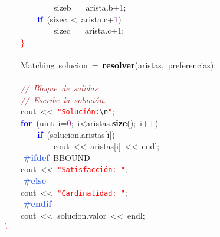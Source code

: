 \mbox{}\ \ \ \ \ \ \ \ \ \ \ \ sizeb\ \textcolor{BrickRed}{=}\ arista\textcolor{BrickRed}{.}b\textcolor{BrickRed}{+}\textcolor{Purple}{1}\textcolor{BrickRed}{;} \\
\mbox{}\ \ \ \ \ \ \ \ \textbf{\textcolor{Blue}{if}}\ \textcolor{BrickRed}{(}sizec\ \textcolor{BrickRed}{\textless{}}\ arista\textcolor{BrickRed}{.}c\textcolor{BrickRed}{+}\textcolor{Purple}{1}\textcolor{BrickRed}{)} \\
\mbox{}\ \ \ \ \ \ \ \ \ \ \ \ sizec\ \textcolor{BrickRed}{=}\ arista\textcolor{BrickRed}{.}c\textcolor{BrickRed}{+}\textcolor{Purple}{1}\textcolor{BrickRed}{;} \\
\mbox{}\ \ \ \ \textcolor{Red}{\}} \\
\mbox{} \\
\mbox{}\ \ \ \ \textcolor{TealBlue}{Matching}\ solucion\ \textcolor{BrickRed}{=}\ \textbf{\textcolor{Black}{resolver}}\textcolor{BrickRed}{(}aristas\textcolor{BrickRed}{,}\ preferencias\textcolor{BrickRed}{);} \\
\mbox{} \\
\mbox{}\ \ \ \ \textit{\textcolor{Brown}{//\ Bloque\ de\ salidas}} \\
\mbox{}\ \ \ \ \textit{\textcolor{Brown}{//\ Escribe\ la\ solución.}} \\
\mbox{}\ \ \ \ cout\ \textcolor{BrickRed}{\textless{}\textless{}}\ \texttt{\textcolor{Red}{"{}Solución:}}\texttt{\textcolor{CarnationPink}{\textbackslash{}n}}\texttt{\textcolor{Red}{"{}}}\textcolor{BrickRed}{;} \\
\mbox{}\ \ \ \ \textbf{\textcolor{Blue}{for}}\ \textcolor{BrickRed}{(}\textcolor{TealBlue}{uint}\ i\textcolor{BrickRed}{=}\textcolor{Purple}{0}\textcolor{BrickRed}{;}\ i\textcolor{BrickRed}{\textless{}}aristas\textcolor{BrickRed}{.}\textbf{\textcolor{Black}{size}}\textcolor{BrickRed}{();}\ i\textcolor{BrickRed}{++)} \\
\mbox{}\ \ \ \ \ \ \ \ \textbf{\textcolor{Blue}{if}}\ \textcolor{BrickRed}{(}solucion\textcolor{BrickRed}{.}aristas\textcolor{BrickRed}{[}i\textcolor{BrickRed}{])} \\
\mbox{}\ \ \ \ \ \ \ \ \ \ \ \ cout\ \textcolor{BrickRed}{\textless{}\textless{}}\ aristas\textcolor{BrickRed}{[}i\textcolor{BrickRed}{]}\ \textcolor{BrickRed}{\textless{}\textless{}}\ endl\textcolor{BrickRed}{;} \\
\mbox{}\textbf{\textcolor{RoyalBlue}{\ \ \ \ \#ifdef}}\ BBOUND \\
\mbox{}\ \ \ \ cout\ \textcolor{BrickRed}{\textless{}\textless{}}\ \texttt{\textcolor{Red}{"{}Satisfacción:\ "{}}}\textcolor{BrickRed}{;} \\
\mbox{}\textbf{\textcolor{RoyalBlue}{\ \ \ \ \#else}} \\
\mbox{}\ \ \ \ cout\ \textcolor{BrickRed}{\textless{}\textless{}}\ \texttt{\textcolor{Red}{"{}Cardinalidad:\ "{}}}\textcolor{BrickRed}{;} \\
\mbox{}\textbf{\textcolor{RoyalBlue}{\ \ \ \ \#endif}} \\
\mbox{}\ \ \ \ cout\ \textcolor{BrickRed}{\textless{}\textless{}}\ solucion\textcolor{BrickRed}{.}valor\ \textcolor{BrickRed}{\textless{}\textless{}}\ endl\textcolor{BrickRed}{;} \\
\mbox{}\textcolor{Red}{\}} \\
\mbox{}
